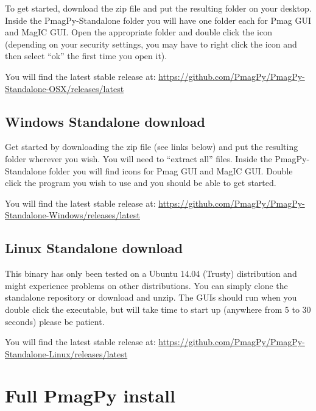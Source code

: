 \documentclass[11pt]{book}
\begin{document}
{\begin{itemize}
To get started, download the zip file and put the resulting folder on your desktop. Inside the PmagPy-Standalone folder you will have one folder each for Pmag GUI and MagIC GUI. Open the appropriate folder and double click the icon (depending on your security settings, you may have to right click the icon and then select ``ok'' the first time you open it).

\noindent You will find the latest stable release at: \href{https://github.com/PmagPy/PmagPy-Standalone-OSX/releases/latest}{https://github.com/PmagPy/PmagPy-Standalone-OSX/releases/latest}

\subsection{Windows Standalone download}

Get started by downloading the zip file (see links below) and put the resulting folder wherever you wish. You will need to “extract all” files. Inside the PmagPy-Standalone folder you will find icons for Pmag GUI and MagIC GUI. Double click the program you wish to use and you should be able to get started.

\noindent You will find the latest stable release at: \href{https://github.com/PmagPy/PmagPy-Standalone-Windows/releases/latest}{https://github.com/PmagPy/PmagPy-Standalone-Windows/releases/latest}

\subsection{Linux Standalone download}

This binary has only been tested on a Ubuntu 14.04 (Trusty) distribution and might experience problems on other distributions. You can simply clone the standalone repository or download and unzip. The GUIs should run when you double click the executable, but will take time to start up (anywhere from 5 to 30 seconds) please be patient.

\noindent You will find the latest stable release at: \href{https://github.com/PmagPy/PmagPy-Standalone-Linux/releases/latest}{https://github.com/PmagPy/PmagPy-Standalone-Linux/releases/latest}


\section{Full PmagPy install}


\end{itemize}}
\end{document}

